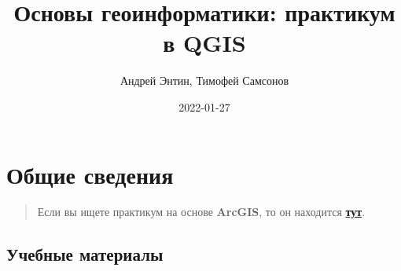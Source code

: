 \documentclass[
  12pt,
]{book}
\title{Основы геоинформатики: практикум в QGIS}
\author{Андрей Энтин, Тимофей Самсонов}
\date{2022-01-27}
\begin{document}
\maketitle

{
\hypersetup{linkcolor=}
\setcounter{tocdepth}{1}
\tableofcontents
}
\hypertarget{ux43eux431ux449ux438ux435-ux441ux432ux435ux434ux435ux43dux438ux44f}{%
\chapter*{Общие сведения}\label{ux43eux431ux449ux438ux435-ux441ux432ux435ux434ux435ux43dux438ux44f}}

\begin{quote}
Если вы ищете практикум на основе \textbf{ArcGIS}, то он находится \href{https://tsamsonov.github.io/arcgis-course/}{\textbf{тут}}.
\end{quote}

\hypertarget{ux443ux447ux435ux431ux43dux44bux435-ux43cux430ux442ux435ux440ux438ux430ux43bux44b}{%
\section*{Учебные материалы}\label{ux443ux447ux435ux431ux43dux44bux435-ux43cux430ux442ux435ux440ux438ux430ux43bux44b}}
\end{document}
